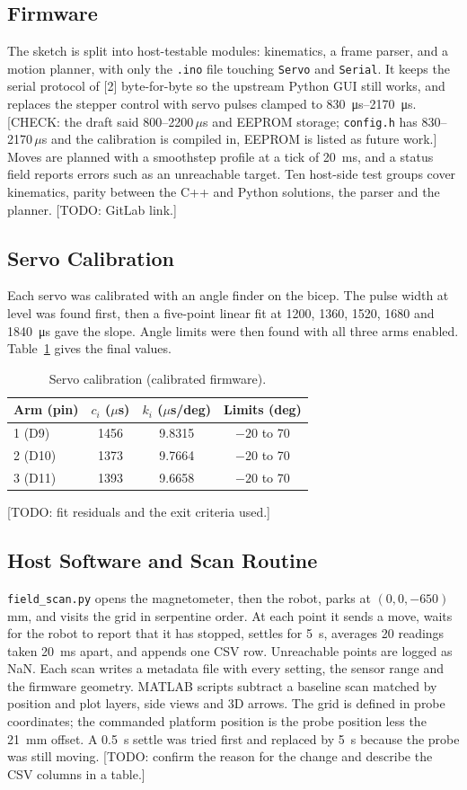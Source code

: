 \documentclass[conference]{IEEEtran}
\begin{document}
\subsection{Firmware}
The sketch is split into host-testable modules: kinematics, a frame parser, and a
motion planner, with only the \texttt{.ino} file touching \texttt{Servo} and
\texttt{Serial}. It keeps the serial protocol of [2] byte-for-byte so the upstream
Python GUI still works, and replaces the stepper control with servo pulses clamped to
\SIrange{830}{2170}{\micro s}. [CHECK: the draft said 800--2200\,$\mu$s and EEPROM
storage; \texttt{config.h} has 830--2170\,$\mu$s and the calibration is compiled in,
EEPROM is listed as future work.] Moves are planned with a smoothstep profile at a tick
of \SI{20}{ms}, and a status field reports errors such as an unreachable target. Ten
host-side test groups cover kinematics, parity between the C++ and Python solutions,
the parser and the planner. [TODO: GitLab link.]

\subsection{Servo Calibration}
Each servo was calibrated with an angle finder on the bicep. The pulse width at
level was found first, then a five-point linear fit at 1200, 1360, 1520, 1680 and
\SI{1840}{\micro s} gave the slope. Angle limits were then found with all three arms
enabled. Table~\ref{tab:cal} gives the final values.
\begin{table}[t]
\caption{Servo calibration (calibrated firmware).}
\label{tab:cal}
\centering\small
\begin{tabular}{lccc}
\toprule
Arm (pin) & $c_i$ ($\mu$s) & $k_i$ ($\mu$s/deg) & Limits (deg) \\
\midrule
1 (D9)  & 1456 & 9.8315 & $-20$ to 70 \\
2 (D10) & 1373 & 9.7664 & $-20$ to 70 \\
3 (D11) & 1393 & 9.6658 & $-20$ to 70 \\
\bottomrule
\end{tabular}
\end{table}
[TODO: fit residuals and the exit criteria used.]

\subsection{Host Software and Scan Routine}
\texttt{field\_scan.py} opens the magnetometer, then the robot, parks at
$(0,0,-650)$\,mm, and visits the grid in serpentine order. At each point it sends a
move, waits for the robot to report that it has stopped, settles for \SI{5}{s},
averages 20 readings taken \SI{20}{ms} apart, and appends one CSV row. Unreachable
points are logged as NaN. Each scan writes a metadata file with every setting,
the sensor range and the firmware geometry. MATLAB scripts subtract a
baseline scan matched by position and plot layers, side views and 3D arrows.
The grid is defined in probe coordinates; the commanded platform position is the
probe position less the \SI{21}{mm} offset. A \SI{0.5}{s} settle was tried first and
replaced by \SI{5}{s} because the probe was still moving.
[TODO: confirm the reason for the change and describe the CSV columns in a table.]
\end{document}
